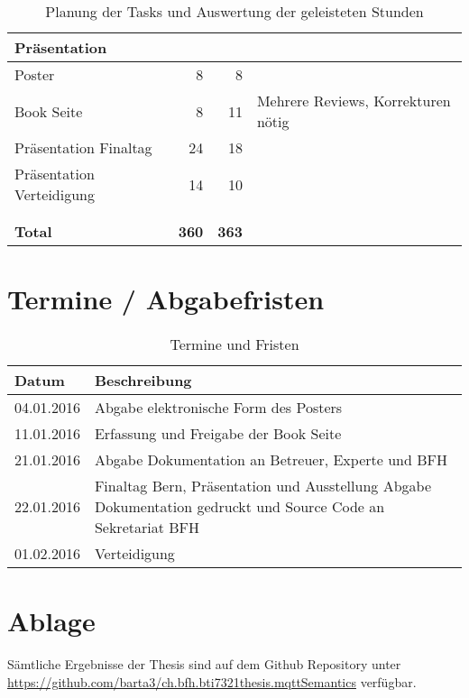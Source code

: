 \begin{table}[H]
\begin{tabularx}{\textwidth}{|l|r|r|X|}
 \textbf{Präsentation}              &      &       &   \\ \hline
 Poster                             &   8  &   8   &   \\ \hline
 Book Seite                         &   8  &  11   &  Mehrere Reviews, Korrekturen nötig\\ \hline
 Präsentation Finaltag              &  24  &  18   &   \\ \hline
 Präsentation Verteidigung          &  14  &  10   &   \\ \hline
     &      &       &   \\ \hline
     &      &       &   \\ \hline
 \textbf{Total}                     & \textbf{360}  &  \textbf{363}     &   \\ \hline

\end{tabularx}
\caption{Planung der Tasks und Auswertung der geleisteten Stunden}
\end{table}


\section{Termine / Abgabefristen}
\begin{table}[H]
\begin{tabularx}{\textwidth}{|l|X|}

 \hline \rowcolor{lightgray}
 {\bf Datum } & {\bf Beschreibung } \\  \hline
 04.01.2016   & Abgabe elektronische Form des Posters  \\ \hline
 11.01.2016   & Erfassung und Freigabe der Book Seite  \\ \hline
 21.01.2016   & Abgabe Dokumentation an Betreuer, Experte und BFH  \\ \hline
 22.01.2016   & Finaltag Bern, Präsentation und Ausstellung \newline
                Abgabe Dokumentation gedruckt und Source Code an Sekretariat BFH  \\ \hline
 01.02.2016   & Verteidigung \\ \hline

\end{tabularx}
\caption{Termine und Fristen}
\end{table}

\section{Ablage}
Sämtliche Ergebnisse der Thesis sind auf dem Github Repository unter \\ \url{https://github.com/barta3/ch.bfh.bti7321thesis.mqttSemantics} verfügbar.

